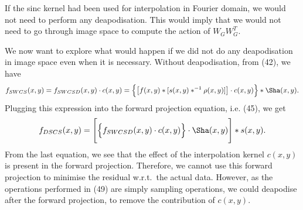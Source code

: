 \documentclass[11pt]{article}
\begin{document}
{\color{gray}
If the sinc kernel had been used for interpolation in Fourier domain, we would not need to perform any deapodisation. This would imply that we would not need to go through image space to compute the action of $W_G W^T_G$.  

We now want to explore what would happen if we did not do any deapodisation in image space even when it is necessary. Without deapodisation, from (42), we have
\begin{equation}
f_{SWCS}(x,y) = f_{SWCSD}(x,y) \cdot c(x,y) = \Big\{\big[f(x,y) \ast [s(x,y) \ast^{-1} \rho(x,y)]\big] \cdot c(x,y)\Big\} \ast \Sha(x,y).
\end{equation}
Plugging this expression into the forward projection equation, i.e. (45), we get
\begin{equation}
f_{DSCS}(x,y) = \Bigg[\Big\{f_{SWCSD}(x,y) \cdot c(x,y)\Big\}\cdot \Sha(x,y) \Bigg] \ast s(x,y).
\end{equation}
From the last equation, we see that the effect of the interpolation kernel $c(x,y)$ is present in the forward projection. Therefore, we cannot use this forward projection to minimise the residual w.r.t.~the actual data. However, as the operations performed in (49) are simply sampling operations, we could deapodise after the forward projection, to remove the contribution of $c(x,y)$.
}
\end{document}
